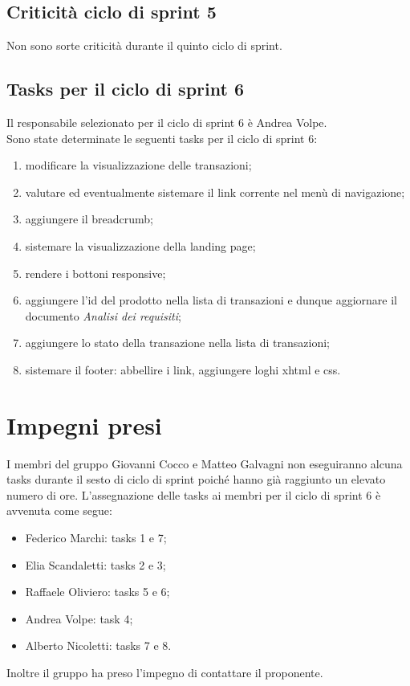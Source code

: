 \documentclass[a4paper, 12pt]{article}
\begin{document}
\subsection{Criticità ciclo di sprint 5}
Non sono sorte criticità durante il quinto ciclo di sprint.


\subsection{Tasks per il ciclo di sprint 6}
Il responsabile selezionato per il ciclo di sprint 6 è Andrea Volpe. \\
Sono state determinate le seguenti tasks per il ciclo di sprint 6:
\begin{enumerate}
	\item modificare la visualizzazione delle transazioni;
  \item valutare ed eventualmente sistemare il link corrente nel menù di navigazione;
  \item aggiungere il breadcrumb;
  \item sistemare la visualizzazione della landing page;
  \item rendere i bottoni responsive;
  \item aggiungere l'id del prodotto nella lista di transazioni e dunque aggiornare il documento \textit{Analisi dei requisiti};
  \item aggiungere lo stato della transazione nella lista di transazioni;
  \item sistemare il footer: abbellire i link, aggiungere loghi xhtml e css.
\end{enumerate}

\section{Impegni presi}
I membri del gruppo Giovanni Cocco e Matteo Galvagni non eseguiranno alcuna tasks durante il sesto di ciclo di sprint poiché hanno già raggiunto un elevato numero di ore.
L'assegnazione delle tasks ai membri per il ciclo di sprint 6 è avvenuta come segue:
\begin{itemize}
  \item Federico Marchi: tasks 1 e 7;
  \item Elia Scandaletti: tasks 2 e 3;
  \item Raffaele Oliviero: tasks 5 e 6;
  \item Andrea Volpe: task 4;
  \item Alberto Nicoletti: tasks 7 e 8.
\end{itemize}
Inoltre il gruppo ha preso l'impegno di contattare il proponente.
\end{document}

